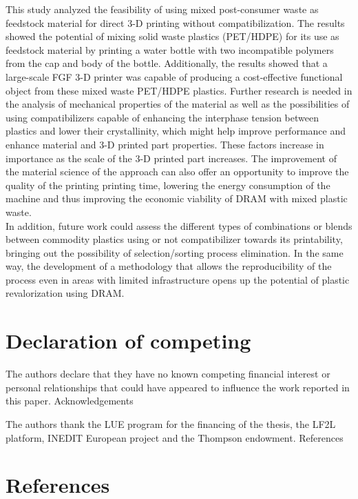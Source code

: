 \documentclass[
  12pt,
  number,
  review]{elsarticle}
\begin{document}
This study analyzed the feasibility of using mixed post-consumer waste
as feedstock material for direct 3-D printing without compatibilization.
The results showed the potential of mixing solid waste plastics
(PET/HDPE) for its use as feedstock material by printing a water bottle
with two incompatible polymers from the cap and body of the bottle.
Additionally, the results showed that a large-scale FGF 3-D printer was
capable of producing a cost-effective functional object from these mixed
waste PET/HDPE plastics. Further research is needed in the analysis of
mechanical properties of the material as well as the possibilities of
using compatibilizers capable of enhancing the interphase tension
between plastics and lower their crystallinity, which might help improve
performance and enhance material and 3-D printed part properties. These
factors increase in importance as the scale of the 3-D printed part
increases. The improvement of the material science of the approach can
also offer an opportunity to improve the quality of the printing
printing time, lowering the energy consumption of the machine and thus
improving the economic viability of DRAM with mixed plastic waste.\\
In addition, future work could assess the different types of
combinations or blends between commodity plastics using or not
compatibilizer towards its printability, bringing out the possibility of
selection/sorting process elimination. In the same way, the development
of a methodology that allows the reproducibility of the process even in
areas with limited infrastructure opens up the potential of plastic
revalorization using DRAM.

\hypertarget{declaration-of-competing}{%
\section{Declaration of competing}\label{declaration-of-competing}}

The authors declare that they have no known competing financial interest
or personal relationships that could have appeared to influence the work
reported in this paper. Acknowledgements

The authors thank the LUE program for the financing of the thesis, the
LF2L platform, INEDIT European project and the Thompson endowment.
References

\hypertarget{references}{%
\section*{References}\label{references}}
\end{document}

